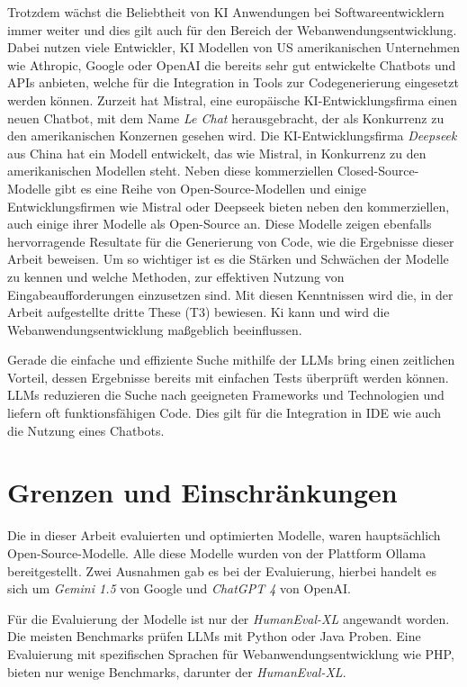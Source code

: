 Trotzdem wächst die Beliebtheit von KI Anwendungen bei Softwareentwicklern immer weiter und dies gilt auch für den Bereich der Webanwendungsentwicklung. Dabei nutzen viele Entwickler, KI Modellen von US amerikanischen Unternehmen wie Athropic, Google oder OpenAI die bereits sehr gut entwickelte Chatbots und APIs anbieten, welche für die Integration in Tools zur Codegenerierung eingesetzt werden können. Zurzeit hat Mistral, eine europäische KI-Entwicklungsfirma einen neuen Chatbot, mit dem Name \textit{Le Chat} herausgebracht, der als Konkurrenz zu den amerikanischen Konzernen gesehen wird. Die KI-Entwicklungsfirma \textit{Deepseek} aus China hat ein Modell entwickelt, das wie Mistral, in Konkurrenz zu den amerikanischen Modellen steht. Neben diese kommerziellen Closed-Source-Modelle gibt es eine Reihe von Open-Source-Modellen und einige Entwicklungsfirmen wie Mistral oder Deepseek bieten neben den kommerziellen, auch einige ihrer Modelle als Open-Source an. Diese Modelle zeigen ebenfalls hervorragende Resultate für die Generierung von Code, wie die Ergebnisse dieser Arbeit beweisen. Um so wichtiger ist es die Stärken und Schwächen der Modelle zu kennen und welche Methoden, zur effektiven Nutzung von Eingabeaufforderungen einzusetzen sind. Mit diesen Kenntnissen wird die, in der Arbeit aufgestellte dritte These (T3) bewiesen. Ki kann und wird die Webanwendungsentwicklung maßgeblich beeinflussen.\vspace{0.2cm}

Gerade die einfache und effiziente Suche mithilfe der LLMs bring einen zeitlichen Vorteil, dessen Ergebnisse bereits mit einfachen Tests überprüft werden können. LLMs reduzieren die Suche nach geeigneten Frameworks und Technologien und liefern oft funktionsfähigen Code. Dies gilt für die Integration in \acrshort{IDE} wie auch die Nutzung eines Chatbots.

\section{Grenzen und Einschränkungen}
Die in dieser Arbeit evaluierten und optimierten Modelle, waren hauptsächlich Open-Source-Modelle. Alle diese Modelle wurden von der Plattform Ollama bereitgestellt. Zwei Ausnahmen gab es bei der Evaluierung, hierbei handelt es sich um \textit{Gemini 1.5} von Google und \textit{ChatGPT 4} von OpenAI.\vspace{0.2cm}

Für die Evaluierung der Modelle ist nur der \textit{HumanEval-XL} angewandt worden. Die meisten Benchmarks prüfen LLMs mit Python oder Java Proben. Eine Evaluierung mit spezifischen Sprachen für Webanwendungsentwicklung wie PHP, bieten nur wenige Benchmarks, darunter der \textit{HumanEval-XL}.\vspace{0.2cm}


